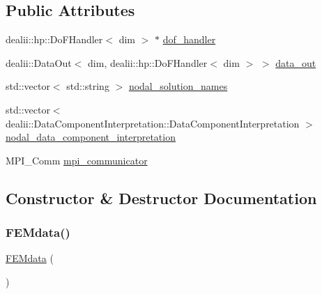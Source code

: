\subsection*{Public Attributes}
\begin{DoxyCompactItemize}
\item 
dealii\+::hp\+::\+Do\+F\+Handler$<$ dim $>$ $\ast$ \mbox{\hyperlink{class_f_e_mdata_a38887e3bbeaa16b46355ba99d22e8063}{dof\+\_\+handler}}
\item 
dealii\+::\+Data\+Out$<$ dim, dealii\+::hp\+::\+Do\+F\+Handler$<$ dim $>$ $>$ \mbox{\hyperlink{class_f_e_mdata_ab8d2ee01f13a0a7b7d2dd50edabbe8b6}{data\+\_\+out}}
\item 
std\+::vector$<$ std\+::string $>$ \mbox{\hyperlink{class_f_e_mdata_a7b00177ad21830fe46a5bf4b1b4a3ea5}{nodal\+\_\+solution\+\_\+names}}
\item 
std\+::vector$<$ dealii\+::\+Data\+Component\+Interpretation\+::\+Data\+Component\+Interpretation $>$ \mbox{\hyperlink{class_f_e_mdata_a42965751ff10a28b5add7c0bfa265cee}{nodal\+\_\+data\+\_\+component\+\_\+interpretation}}
\item 
M\+P\+I\+\_\+\+Comm \mbox{\hyperlink{class_f_e_mdata_a03728ed636ca889ae407c84d181bc611}{mpi\+\_\+communicator}}
\end{DoxyCompactItemize}


\subsection{Constructor \& Destructor Documentation}
\mbox{\label{class_f_e_mdata_abb8edbdb28fbec855696a4a02648ad2d}} 
\subsubsection{\texorpdfstring{FEMdata()}{FEMdata()}\hspace{0.1cm}{\footnotesize\ttfamily [1/2]}}
{\footnotesize\ttfamily \mbox{\hyperlink{class_f_e_mdata}{F\+E\+Mdata}} (\begin{DoxyParamCaption}{ }\end{DoxyParamCaption})}

\mbox{\label{class_f_e_mdata_ada690a46b4cec06866ffa32ca2e07c07}} 
